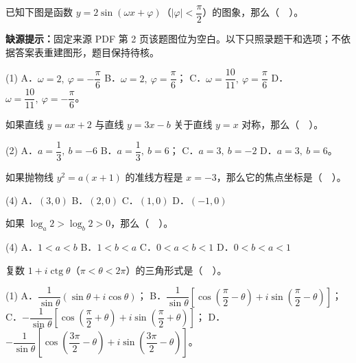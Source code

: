 \begin{question}
已知下图是函数 $y=2\sin(\omega x+\varphi)$（$|\varphi|<\dfrac\pi2$）的图象，那么（　）。

\begin{gktip}
\textbf{缺源提示：}固定来源 PDF 第 2 页该题图位为空白。以下只照录题干和选项；不依据答案表重建图形，题目保持待核。
\end{gktip}

\begin{gkopts}(1)
\task A．$\omega=2,\ \varphi=-\dfrac\pi6$
\task B．$\omega=2,\ \varphi=\dfrac\pi6$；
\task C．$\omega=\dfrac{10}{11},\ \varphi=\dfrac\pi6$
\task D．$\omega=\dfrac{10}{11},\ \varphi=-\dfrac\pi6$。
\end{gkopts}

\end{question}
\begin{question}
如果直线 $y=ax+2$ 与直线 $y=3x-b$ 关于直线 $y=x$ 对称，那么（　）。

\begin{gkopts}(2)
\task A．$a=\dfrac13,\ b=-6$
\task B．$a=\dfrac13,\ b=6$；
\task C．$a=3,\ b=-2$
\task D．$a=3,\ b=6$。
\end{gkopts}

\end{question}
\begin{question}
如果抛物线 $y^2=a(x+1)$ 的准线方程是 $x=-3$，那么它的焦点坐标是（　）。

\begin{gkopts}(4)
\task A．$(3,0)$
\task B．$(2,0)$
\task C．$(1,0)$
\task D．$(-1,0)$
\end{gkopts}

\end{question}
\begin{question}
如果 $\log_a2>\log_b2>0$，那么（　）。

\begin{gkopts}(4)
\task A．$1<a<b$
\task B．$1<b<a$
\task C．$0<a<b<1$
\task D．$0<b<a<1$
\end{gkopts}

\end{question}
\begin{question}
复数 $1+i\operatorname{ctg}\theta$（$\pi<\theta<2\pi$）的三角形式是（　）。

\begin{gkopts}(1)
\task A．$\dfrac1{\sin\theta}(\sin\theta+i\cos\theta)$；
\task B．$\dfrac1{\sin\theta}\left[\cos\left(\dfrac\pi2-\theta\right)+i\sin\left(\dfrac\pi2-\theta\right)\right]$；
\task C．$-\dfrac1{\sin\theta}\left[\cos\left(\dfrac\pi2+\theta\right)+i\sin\left(\dfrac\pi2+\theta\right)\right]$；
\task D．$-\dfrac1{\sin\theta}\left[\cos\left(\dfrac{3\pi}2-\theta\right)+i\sin\left(\dfrac{3\pi}2-\theta\right)\right]$。
\end{gkopts}

\end{question}
